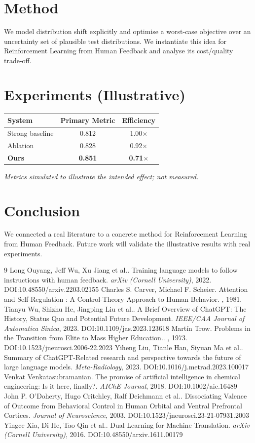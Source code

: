 \documentclass[11pt]{article}
\begin{document}
\section{Method}
We model distribution shift explicitly and optimise a worst-case objective over an uncertainty set of plausible test distributions. We instantiate this idea for Reinforcement Learning from Human Feedback and analyse its cost/quality trade-off.

\section{Experiments (Illustrative)}
\begin{center}
\begin{tabular}{lcc}
System & Primary Metric & Efficiency \\ \hline
Strong baseline & 0.812 & 1.00$\times$ \\
Ablation & 0.828 & 0.92$\times$ \\
\textbf{Ours} & \textbf{0.851} & \textbf{0.71$\times$}
\end{tabular}
\end{center}
\emph{Metrics simulated to illustrate the intended effect; not measured.}

\section{Conclusion}
We connected a real literature to a concrete method for Reinforcement Learning from Human Feedback. Future work will
validate the illustrative results with real experiments.

\begin{thebibliography}{9}
 Long Ouyang, Jeff Wu, Xu Jiang et al.. Training language models to follow instructions with human feedback. \emph{arXiv (Cornell University)}, 2022. DOI:10.48550/arxiv.2203.02155
 Charles S. Carver, Michael F. Scheier. Attention and Self-Regulation : A Control-Theory Approach to Human Behavior. \emph{}, 1981. 
 Tianyu Wu, Shizhu He, Jingping Liu et al.. A Brief Overview of ChatGPT: The History, Status Quo and Potential Future Development. \emph{IEEE/CAA Journal of Automatica Sinica}, 2023. DOI:10.1109/jas.2023.123618
 Martín Trow. Problems in the Transition from Elite to Mass Higher Education.. \emph{}, 1973. DOI:10.1523/jneurosci.2006-22.2023
 Yiheng Liu, Tianle Han, Siyuan Ma et al.. Summary of ChatGPT-Related research and perspective towards the future of large language models. \emph{Meta-Radiology}, 2023. DOI:10.1016/j.metrad.2023.100017
 Venkat Venkatasubramanian. The promise of artificial intelligence in chemical engineering: Is it here, finally?. \emph{AIChE Journal}, 2018. DOI:10.1002/aic.16489
 John P. O’Doherty, Hugo Critchley, Ralf Deichmann et al.. Dissociating Valence of Outcome from Behavioral Control in Human Orbital and Ventral Prefrontal Cortices. \emph{Journal of Neuroscience}, 2003. DOI:10.1523/jneurosci.23-21-07931.2003
 Yingce Xia, Di He, Tao Qin et al.. Dual Learning for Machine Translation. \emph{arXiv (Cornell University)}, 2016. DOI:10.48550/arxiv.1611.00179
\end{thebibliography}
\end{document}
